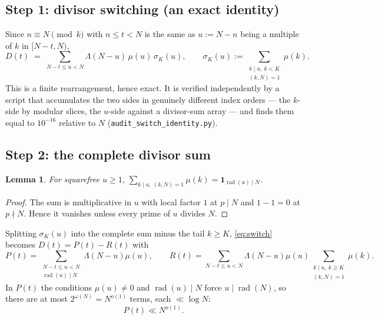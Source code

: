 \documentclass[11pt,a4paper]{article}
\theoremstyle{plain}
\newtheorem{lemma}[theorem]{Lemma}
\theoremstyle{definition}
\theoremstyle{remark}
\DeclareMathOperator{\rad}{rad}
\begin{document}
\subsection{Step 1: divisor switching (an exact identity)}

Since $n\equiv N\pmod k$ with $n\le t<N$ is the same as $u:=N-n$ being
a multiple of $k$ in $[N-t,N)$,
\begin{equation}\label{eq:switch}
  D(t)\;=\;\sum_{N-t\le u<N}\Lambda(N-u)\,\mu(u)\,\sigma_K(u),
  \qquad
  \sigma_K(u):=\sum_{\substack{k\mid u,\ k<K\\ (k,N)=1}}\mu(k).
\end{equation}
This is a finite rearrangement, hence exact. It is verified
independently by a script that accumulates the two sides in genuinely
different index orders --- the $k$-side by modular slices, the
$u$-side against a divisor-sum array --- and finds them equal to
$10^{-16}$ relative to $N$
(\texttt{audit\_switch\_identity.py}).

\subsection{Step 2: the complete divisor sum}

\begin{lemma}\label{lem:complete}
For squarefree $u\ge1$,
$\displaystyle\sum_{k\mid u,\ (k,N)=1}\mu(k)=\mathbf 1_{\rad(u)\mid N}$.
\end{lemma}

\begin{proof}
The sum is multiplicative in $u$ with local factor $1$ at $p\mid N$
and $1-1=0$ at $p\nmid N$. Hence it vanishes unless every prime of $u$
divides $N$.
\end{proof}

Splitting $\sigma_K(u)$ into the complete sum minus the tail $k\ge K$,
\eqref{eq:switch} becomes $D(t)=P(t)-R(t)$ with
\begin{equation}\label{eq:PR}
  P(t)=\!\!\sum_{\substack{N-t\le u<N\\ \rad(u)\mid N}}\!\!\Lambda(N-u)\mu(u),
  \qquad
  R(t)=\!\!\sum_{N-t\le u<N}\!\!\Lambda(N-u)\mu(u)
       \sum_{\substack{k\mid u,\ k\ge K\\ (k,N)=1}}\mu(k).
\end{equation}
In $P(t)$ the conditions $\mu(u)\ne0$ and $\rad(u)\mid N$ force
$u\mid\rad(N)$, so there are at most $2^{\omega(N)}=N^{o(1)}$ terms,
each $\ll\log N$:
\begin{equation}\label{eq:P}
  P(t)\ll N^{o(1)}.
\end{equation}
\end{document}
